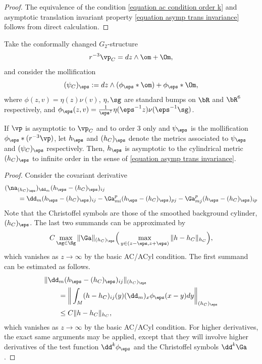 \documentclass[hidelinks, 12pt, oneside, reqno]{amsart}
\begin{document}
\begin{proof}
    The equivalence of the condition \eqref{equation ac condition order k} and asymptotic translation invariant property \eqref{equation asymp trans invariance} follows from direct calculation.
\end{proof}

Take the conformally changed $G_2$-structure 
\[
r^{-3} \vp_C = dz \wedge \om + \Om,
\]
and consider the mollification
\[
(\psi_C)_\eps := dz \wedge (\phi_\eps * \om) + \phi_\eps * \Om,
\]
where $\phi (z,v) = \eta(z) \nu(v)$, $\eta, \sg$ are standard bumps on $\bR$ and $\bR^6$ respectively, and $\phi_\eps(z,v) = \tfrac{1}{\eps^7}\eta(\eps^{-1}z) \nu(\eps^{-1}\sg)$. 


\begin{lem}\label{lemma infinite ACness of mollified}
    If $\vp$ is asymptotic to $\vp_C$ and to order 3 only and $\psi_\eps$ is the mollification $\phi_\eps * (r^{-3}\vp)$, let $h_\eps$ and $(h_C)_\eps$ denote the metrics associated to $\psi_\eps$ and $(\psi_C)_\eps$ respectively. Then, $h_\eps$ is asymptotic to the cylindrical metric $(h_C)_\eps$ to infinite order in the sense of \eqref{equation asymp trans invariance}.
\end{lem}

\begin{proof}
    Consider the covariant derivative
    \begin{align*}
        &(\na_{(h_C)_\eps})_{\dd_m} (h_\eps - (h_C)_\eps)_{ij} \\
        &\qquad = \dd_m (h_\eps - (h_C)_\eps)_{ij} - \Ga_{mi}^p(h_\eps - (h_C)_\eps)_{pj} - \Ga_{mj}^p(h_\eps - (h_C)_\eps)_{ip}
    \end{align*}
Note that the Christoffel symbols are those of the smoothed background cylinder, $(h_C)_\eps$. The last two summands can be approximated by 
\begin{align*}
    C\max_{\sg \in \Sg} \|\Ga\|_{(h_C)_\eps} \Big( \max_{y \in (z-\eps, z+ \eps)} \|h - h_C\|_{h_C} \Big), 
\end{align*}
which vanishes as $z \rightarrow \infty$ by the basic AC/ACyl condition.  The first summand can be estimated as follows.
\begin{align*}
        &\|\dd_m (h_\eps - (h_C)_\eps)_{ij}\|_{(h_C)_\eps} \\
        &\qquad = \bigg\| \int_M (h-h_C)_{ij}(y)(\dd_m)_x \phi_\eps(x-y) dy \bigg\|_{(h_C)_\eps} \\
        &\qquad \le C\|h - h_C\|_{h_C}, 
\end{align*}
which vanishes as $z \rightarrow \infty$ by the basic AC/ACyl condition. For higher derivatives, the exact same arguments may be applied, except that they will involve higher derivatives of the test function $\dd^k \phi_\eps$ and the Christoffel symbols $\dd^k \Ga$. 
\end{proof}
\end{document}
